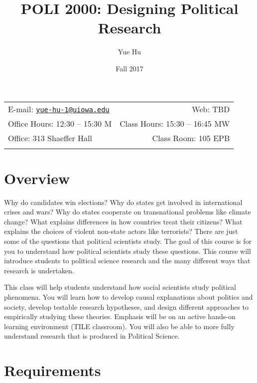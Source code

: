 \documentclass[11pt,]{article}
\title{POLI 2000: Designing Political Research}
\author{Yue Hu}
\date{Fall 2017}
\begin{document}
  

		\maketitle
		
	
		\thispagestyle{firststyle}



	\noindent \begin{tabular*}{\textwidth}{ @{\extracolsep{\fill}} lr @{\extracolsep{\fill}}}


E-mail: \texttt{\href{mailto:yue-hu-1@uiowa.edu}{\nolinkurl{yue-hu-1@uiowa.edu}}} & Web: TBD\\
Office Hours: 12:30 -- 15:30 M  &  Class Hours: 15:30 -- 16:45 MW\\
Office: 313 Shaeffer Hall  & Class Room: 105 EPB\\
	&  \\
	\hline
	\end{tabular*}
	
\vspace{2mm}
	


\section{Overview}\label{overview}

Why do candidates win elections? Why do states get involved in
international crises and wars? Why do states cooperate on transnational
problems like climate change? What explains differences in how countries
treat their citizens? What explains the choices of violent non-state
actors like terrorists? There are just some of the questions that
political scientists study. The goal of this course is for you to
understand how political scientists study these questions. This course
will introduce students to political science research and the many
different ways that research is undertaken.

This class will help students understand how social scientists study
political phenomena. You will learn how to develop causal explanations
about politics and society, develop testable research hypotheses, and
design different approaches to empirically studying these theories.
Emphasis will be on an active hands-on learning environment (TILE
classroom). You will also be able to more fully understand research that
is produced in Political Science.

\section{Requirements}\label{requirements}
\end{document}
